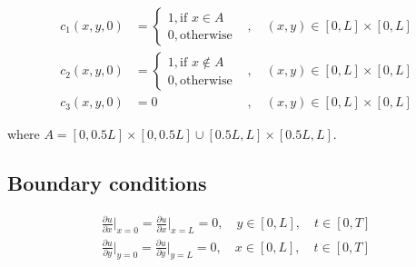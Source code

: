 \documentclass{article}
\begin{document}
\begin{equation}
    \begin{aligned}
        c_1(x, y, 0) &= 
        \begin{cases}
            1, \text{if } x\in A\\
            0, \text{otherwise}
        \end{cases}&, \quad (x, y)\in[0,L]\times[0,L]\\
        c_2(x, y, 0) &= 
        \begin{cases}
            1, \text{if } x\notin A\\
            0, \text{otherwise}
        \end{cases}&, \quad (x, y)\in[0,L]\times[0,L]\\
        c_3(x, y, 0) &= 0&, \quad (x, y)\in[0,L]\times[0,L]
    \end{aligned}
\end{equation}

where $A=[0,0.5L]\times[0,0.5L]\cup[0.5L,L]\times[0.5L,L]$.

\subsection{Boundary conditions}

\begin{equation}
    \begin{split}
        \frac{\partial u}{\partial x}\Big|_{x=0}=\frac{\partial u}{\partial x}\Big|_{x=L}=0,\quad y\in[0,L],\quad t\in[0,T]\\
        \frac{\partial u}{\partial y}\Big|_{y=0}=\frac{\partial u}{\partial y}\Big|_{y=L}=0,\quad x\in[0,L],\quad t\in[0,T]\\
    \end{split}
\end{equation}
\end{document}
